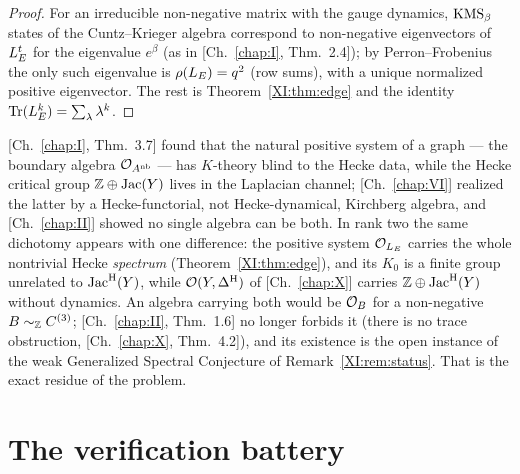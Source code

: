 \begin{proof}
For an irreducible non-negative matrix with the gauge dynamics, $\mathrm{KMS}_\beta$ states of the
Cuntz--Krieger algebra correspond to non-negative eigenvectors of $L_E^{t}$ for the
eigenvalue $e^{\beta}$ (as in [Ch.~\ref{chap:I}, Thm.~2.4]); by Perron--Frobenius the only such eigenvalue is
$\rho(L_E)=q^{2}$ (row sums), with a unique normalized positive eigenvector. The rest is
Theorem~\ref{XI:thm:edge} and the identity $\operatorname{Tr}(L_E^{k})=\sum_\lambda\lambda^{k}$.
\end{proof}

\begin{remark}\label{XI:rem:dichotomy}
[Ch.~\ref{chap:I}, Thm.~3.7] found that the natural positive system of a graph --- the boundary algebra
$\mathcal{O}_{A^{\mathrm{nb}}}$ --- has $K$-theory blind to the Hecke data, while the Hecke critical group
$\mathbb{Z}\oplus\operatorname{Jac}(Y)$ lives in the Laplacian channel; [Ch.~\ref{chap:VI}] realized the latter by a
Hecke-functorial, not Hecke-dynamical, Kirchberg algebra, and [Ch.~\ref{chap:II}] showed no single algebra
can be both. In rank two the same dichotomy appears with one difference: the positive
system $\mathcal{O}_{L_E}$ carries the whole nontrivial Hecke \emph{spectrum} (Theorem~\ref{XI:thm:edge}),
and its $K_0$ is a finite group unrelated to $\operatorname{Jac}^{\mathrm{H}}(Y)$, while $\mathcal{O}(Y,\Delta^{\mathrm{H}})$ of [Ch.~\ref{chap:X}] carries
$\mathbb{Z}\oplus\operatorname{Jac}^{\mathrm{H}}(Y)$ without dynamics. An algebra carrying both would be $\mathcal{O}_B$ for a
non-negative $B\sim_{\mathbb{Z}}C^{(3)}$; [Ch.~\ref{chap:II}, Thm.~1.6] no longer forbids it (there is no trace
obstruction, [Ch.~\ref{chap:X}, Thm.~4.2]), and its existence is the open instance of the weak Generalized
Spectral Conjecture of Remark~\ref{XI:rem:status}. That is the exact residue of the problem.
\end{remark}

\section{The verification battery}\label{XI:sec:battery}

